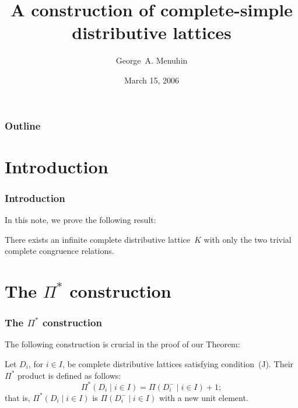 \documentclass{beamer}
\begin{document}
\title{A construction of complete-simple\\  
       distributive lattices}
\author{George~A. Menuhin}
\date{March 15, 2006}

\begin{frame}
\titlepage
\end{frame}

\begin{frame}
\frametitle{Outline}

\tableofcontents[pausesections]
\end{frame}

\section{Introduction}

\begin{frame}
\frametitle{Introduction}

In this note, we prove the following result:

\begin{theorem} 
There exists an infinite complete distributive 
lattice~$K$ with only the two trivial complete 
congruence relations.
\end{theorem}
\end{frame}

\section{The $\Pi^{*}$ construction}

\begin{frame}
\frametitle{The $\Pi^{*}$ construction}

The following construction is crucial in the proof
of our Theorem:

\begin{definition} 
Let $D_{i}$, for $i \in I$, be complete distributive 
lattices satisfying condition~\textup{(J)}.  Their 
$\Pi^{*}$ product is defined as follows:
\[
   \Pi^{*} ( D_{i} \mid i \in I ) = 
   \Pi ( D_{i}^{-} \mid i \in I ) + 1;
\]
that is, $\Pi^{*} ( D_{i} \mid i \in I )$ is 
$\Pi ( D_{i}^{-} \mid i \in I )$ with a new 
unit element. 
\end{definition}
\end{frame}
\end{document}
